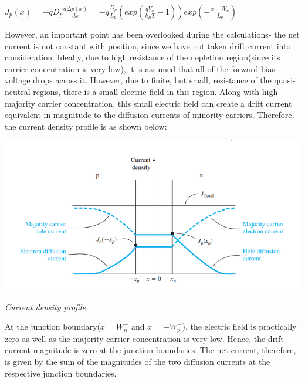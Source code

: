 \documentclass[12 pt]{article}
\begin{document}
\begin{center}
    $ J_{p}(x) = -qD_{p}\frac{d\Delta p(x)}{dx} = -q\frac{D_{p}}{L_{p}}(exp(\frac{qV_{a}}{k_{B}T}-1))exp(-\frac{x-W_{n}}{L_{p}}) $
\end{center}

However, an important point has been overlooked during the calculations- the net current is not constant with position, since we have not taken drift current into consideration. Ideally, due to high resistance of the depletion region(since its carrier concentration is very low), it is assumed that all of the forward bias voltage drops across it. However, due to finite, but small, resistance of the quasi-neutral regions, there is a small electric field in this region. Along with high majority carrier concentration, this small electric field can create a drift current equivalent in magnitude to the diffusion currents of minority carriers. Therefore, the current density profile is as shown below: 

\par
\begin{center}
    \includegraphics{pn_junction_diode_current_profile (1).png}
\end{center}
\begin{center}
    \emph{\hspace{2.5 cm}Current density profile\newline}
\end{center}
\par

At the junction boundary($x = W_{n}^{-}$ and $x = -W_{p}^{+}$), the electric field is practically zero as well as the majority carrier concentration is very low. Hence, the drift current magnitude is zero at the junction boundaries. The net current, therefore, is given by the sum of the magnitudes of the two diffusion currents at the respective junction boundaries. 
\end{document}
